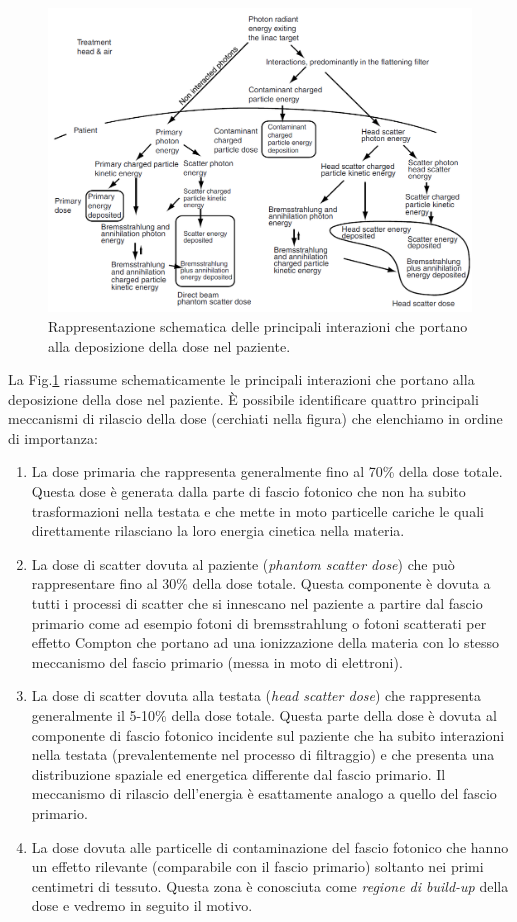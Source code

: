 \begin{figure}
\centering
\includegraphics[width=.9\textwidth]{./cap1/processes.png}
\caption{Rappresentazione schematica delle principali interazioni che portano alla deposizione della dose nel paziente.}
\label{fig:processes}
\end{figure}
\vspace{.2cm}
La Fig.\ref{fig:processes} riassume schematicamente le principali interazioni che portano alla deposizione della dose nel paziente. \`{E} possibile identificare quattro principali meccanismi di rilascio della dose (cerchiati nella figura) che elenchiamo in ordine di importanza:
\begin{enumerate}
\item La dose primaria che rappresenta generalmente fino al 70\% della dose totale. Questa dose è generata dalla parte di fascio fotonico che non ha subito trasformazioni nella testata e che mette in moto particelle cariche le quali direttamente rilasciano la loro energia cinetica nella materia.
\item La dose di scatter dovuta al paziente (\textit{phantom scatter dose}) che può rappresentare fino al 30\% della dose totale. Questa componente è dovuta a tutti i processi di scatter che si innescano nel paziente a partire dal fascio primario come ad esempio fotoni di bremsstrahlung o fotoni scatterati per effetto Compton che portano ad una ionizzazione della materia con lo stesso meccanismo del fascio primario (messa in moto di elettroni).
\item La dose di scatter dovuta alla testata (\textit{head scatter dose}) che rappresenta generalmente il 5-10\% della dose totale. Questa parte della dose è dovuta al componente di fascio fotonico incidente sul paziente che ha subito interazioni nella testata (prevalentemente nel processo di filtraggio) e che presenta una distribuzione spaziale ed energetica differente dal fascio primario. Il meccanismo di rilascio dell'energia è esattamente analogo a quello del fascio primario.
\item La dose dovuta alle particelle di contaminazione del fascio fotonico che hanno un effetto rilevante (comparabile con il fascio primario) soltanto nei primi centimetri di tessuto. Questa zona è conosciuta come \textit{regione di build-up} della dose e vedremo in seguito il motivo.
\end{enumerate}


